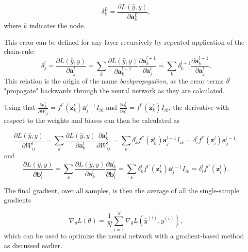 \begin{equation}\label{eq:lastLayerError}
    \delta^L_k = \frac{\partial L(\hat{y}, y)}{\partial \boldsymbol{a}^L_k},
\end{equation}
where $k$ indicates the node.

This error can be defined for any layer recursively by repeated application of the chain-rule:
\begin{equation}\label{eq:error}
    \delta^l_j = \frac{\partial L(\hat{y}, y)}{\partial \boldsymbol{a}^l_j} 
    = \sum_k \frac{\partial L(\hat{y}, y)}{\partial \boldsymbol{a}^{l+1}_k} \frac{\partial \boldsymbol{a}^{l+1}_k}{\partial \boldsymbol{a}^{l}_j}
    = \sum_k \delta^{l+1}_k \frac{\partial \boldsymbol{a}^{l+1}_k}{\partial \boldsymbol{a}^{l}_j}.
\end{equation}
This relation is the origin of the name \emph{backpropogation}, as the error terms $\delta^l$ "propagate" backwards through the neural network as they are calculated.

Using that 
$\frac{\partial \boldsymbol{a}^{l}_k}{\partial W^l_{ij}} = f^{l\prime}(\boldsymbol{z}^{l}_k)\boldsymbol{a}^{l-1}_j I_{ik}$ 
and 
$\frac{\partial \boldsymbol{a}^{l}_k}{\partial \boldsymbol{b}^l_{i}} = f^{l\prime}(\boldsymbol{z}^{l}_k) I_{ik}$, the derivative with respect to the weights and biases can then be calculated as 

\begin{equation}\label{eq:derivweights}
    \frac{\partial L(\hat{y}, y)}{\partial W^l_{ij}} = 
    \sum_k \frac{\partial L(\hat{y}, y)}{\partial \boldsymbol{a}^{l}_k} \frac{\partial \boldsymbol{a}^{l}_k}{\partial W^l_{ij}} = 
    \sum_k \delta^{l}_k f^{l\prime}(\boldsymbol{z}^{l}_k)\boldsymbol{a}^{l-1}_j I_{ik}=
    \delta^{l}_i f^{l\prime}(\boldsymbol{z}^l_i) \boldsymbol{a}^{l-1}_j,
\end{equation}
and
\begin{equation}\label{eq:derivbiases}
    \frac{\partial L(\hat{y}, y)}{\partial \boldsymbol{b}^l_{i}} = 
    \sum_k \frac{\partial L(\hat{y}, y)}{\partial \boldsymbol{a}^{l}_k} \frac{\partial \boldsymbol{a}^{l}_k}{\partial \boldsymbol{b}^l_{i}} = 
    \sum_k \delta^{l}_k f^{l\prime}(\boldsymbol{z}^{l}_k)\boldsymbol{a}^{l-1}_j I_{ik}=
    \delta^{l}_i f^{l\prime}(\boldsymbol{z}^l_i).
\end{equation}

The final gradient, over all samples, is then the average of all the single-sample gradients

\begin{equation}\label{eq:averageGradient}
    \nabla_\theta L(\theta) = \frac{1}{N}\sum_{i=1}^N \nabla_\theta L(\hat{y}^{(i)}, y^{(i)}),
\end{equation}
which can be used to optimize the neural network with a gradient-based method as discussed earlier.